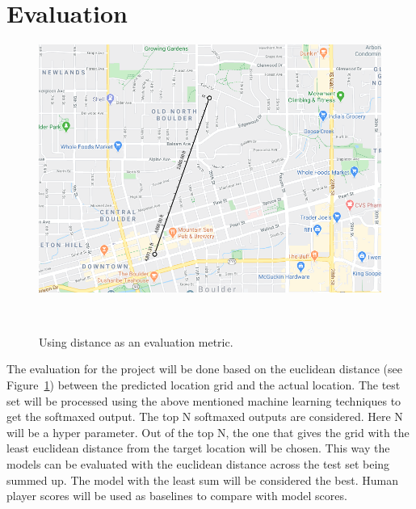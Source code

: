 \documentclass{sigchi}
\begin{document}
 
 \section{Evaluation}
  \begin{figure}
  \centering
  \includegraphics[width=0.7\columnwidth]{figures/evals.png}
  \caption{Using distance as an evaluation metric.}~\label{fig:figure4}
\end{figure}
 The evaluation for the project will be done based on the euclidean distance (see Figure~\ref{fig:figure4}) between the predicted location grid and the actual location. The test set will be processed using the above mentioned machine learning techniques to get the softmaxed output. The top N softmaxed outputs are considered. Here N will be a hyper parameter. Out of the top N, the one that gives the grid with the least euclidean distance from the target location will be chosen. This way the models can be evaluated with the euclidean distance across the test set being summed up. The model with the least sum will be considered the best. Human player scores will be used as baselines to compare with model scores.


\balance{}


% 


\end{document}
